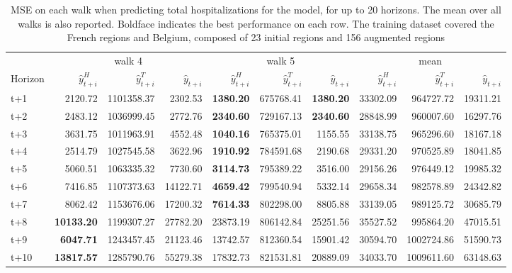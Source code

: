 \begin{table}[H]
\centering
\caption{MSE on each walk when predicting total hospitalizations for the model, for up to 20 horizons. The mean over all walks is also reported. Boldface indicates the best performance on each row. The training dataset covered the French regions and Belgium, composed of 23 initial regions and 156 augmented regions }
\label{tab:MSE_walk_assemble}
\begin{tabular}{lrrrrrrrrr}
\toprule
 & \multicolumn{3}{c}{walk 4} & \multicolumn{3}{c}{walk 5} & \multicolumn{3}{c}{mean} 
\\

\cmidrule(lr){2-4} \cmidrule(lr){5-7} \cmidrule(lr){8-10} 
Horizon & $\hat{y}_{t+i}^H$ & $\hat{y}_{t+i}^T$ & $\hat{y}_{t+i}$ & $\hat{y}_{t+i}^H$ & $\hat{y}_{t+i}^T$ & $\hat{y}_{t+i}$ & $\hat{y}_{t+i}^H$ & $\hat{y}_{t+i}^T$ & $\hat{y}_{t+i}$ \\
\midrule
t+1  & 2120.72  & 1101358.37  & 2302.53  & \textbf{1380.20}  & 675768.41  & \textbf{1380.20}  & 33302.09  & 964727.72  & 19311.21  \\
t+2  & 2483.12  & 1036999.45  & 2772.76  & \textbf{2340.60}  & 729167.13  & \textbf{2340.60}  & 28848.99  & 960007.60  & 16297.76  \\
t+3  & 3631.75  & 1011963.91  & 4552.48  & \textbf{1040.16}  & 765375.01  & 1155.55  & 33138.75  & 965296.60  & 18167.18  \\
t+4  & 2514.79  & 1027545.58  & 3622.96  & \textbf{1910.92}  & 784591.68  & 2190.68  & 29331.20  & 970525.89  & 18041.85  \\
t+5  & 5060.51  & 1063335.32  & 7730.60  & \textbf{3114.73}  & 795389.22  & 3516.00  & 29156.26  & 976449.12  & 19985.32  \\
t+6  & 7416.85  & 1107373.63  & 14122.71  & \textbf{4659.42}  & 799540.94  & 5332.14  & 29658.34  & 982578.89  & 24342.82  \\
t+7  & 8062.42  & 1153676.06  & 17200.32  & \textbf{7614.33}  & 802298.00  & 8805.88  & 33139.05  & 989125.72  & 30685.79  \\
t+8  & \textbf{10133.20}  & 1199307.27  & 27782.20  & 23873.19  & 806142.84  & 25251.56  & 35527.52  & 995864.20  & 47015.51  \\
t+9  & \textbf{6047.71}  & 1243457.45  & 21123.46  & 13742.57  & 812360.54  & 15901.42  & 30594.70  & 1002724.86  & 51590.73  \\
t+10  & \textbf{13817.57}  & 1285790.76  & 55279.38  & 17832.73  & 821531.81  & 20889.09  & 34033.70  & 1009611.60  & 63148.63  \\

\end{tabular}
\end{table}
